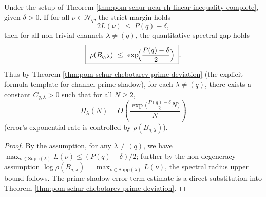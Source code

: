 \begin{corollary}\label{cor:pom-schur-near-rh-margin-propagation}
Under the setup of Theorem \ref{thm:pom-schur-near-rh-linear-inequality-complete}, given \(\delta>0\).
If for all \(\nu\in\mathcal{N}_q\), the strict margin holds
\[
2L(\nu)\ \le\ P(q)-\delta,
\]
then for all non-trivial channels \(\lambda\neq(q)\), the quantitative spectral gap holds
\[
\boxed{\;
\rho(B_{q,\lambda})\ \le\ \exp\!\Bigl(\frac{P(q)-\delta}{2}\Bigr)\; }.
\]
Thus by Theorem \ref{thm:pom-schur-chebotarev-prime-deviation} (the explicit formula template for channel prime-shadow),
for each \(\lambda\neq(q)\), there exists a constant \(C_{q,\lambda}>0\) such that for all \(N\ge2\),
\[
\boxed{\;
\Pi_\lambda(N)=O\!\left(\frac{\exp\!\bigl(\tfrac{P(q)-\delta}{2}N\bigr)}{N}\right)\;}
\]
(error's exponential rate is controlled by \(\rho(B_{q,\lambda})\)).
\end{corollary}
\begin{proof}
By the assumption, for any \(\lambda\neq(q)\), we have
\(
\max_{\nu\in\mathrm{Supp}(\lambda)}L(\nu)\le (P(q)-\delta)/2
\);
further by the non-degeneracy assumption \(\log\rho(B_{q,\lambda})=\max_{\nu\in\mathrm{Supp}(\lambda)}L(\nu)\), the spectral radius upper bound follows.
The prime-shadow error term estimate is a direct substitution into Theorem \ref{thm:pom-schur-chebotarev-prime-deviation}.
\end{proof}

